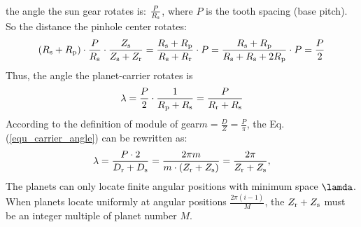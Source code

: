 \documentclass[a4paper,fleqn]{cas-sc}%
\begin{document}
the angle the sun gear rotates is: $\frac{P}{R_{\rm s}}$, where $P$ is the tooth spacing (base pitch). So the distance the pinhole center rotates:
\begin{equation}
    (R_{\rm s}+R_{\rm p}) \cdot \frac{P}{R_{\rm s}} \cdot \frac{Z_{\rm s}}{Z_{\rm s}+Z_{\rm r}}
    =\frac{R_{\rm s}+R_{\rm p}}{R_{\rm s}+R_{\rm r}} \cdot P
    =\frac{R_{\rm s}+R_{\rm p}}{R_{\rm s}+R_{\rm s}+2R_{\rm p}} \cdot P
    =\frac{P}{2}
\end{equation}
Thus, the angle the planet-carrier rotates is
\begin{equation}
    \lambda=\frac{P}{2} \cdot \frac{1}{R_{\rm p}+R_{\rm s}}
    =\frac{P}{R_{\rm r}+R_{\rm s}}
    \label{equ_carrier_angle}
\end{equation}
According to the definition of module of gear$m=\frac{D}{Z}=\frac{P}{\pi}$, the Eq. (\ref{equ_carrier_angle}) can be rewritten as:
\begin{equation}
    \lambda=\frac{P \cdot 2}{D_{\rm r}+D_{\rm s}}
    =\frac{2 \pi m}{m \cdot ({Z_{\rm r}}+Z_{\rm s})}
    =\frac{2 \pi}{Z_{\rm r}+Z_{\rm s}},
\end{equation}
The planets can only locate finite angular positions with minimum space $\lamda$. When planets locate uniformly at angular positions $\frac{2\pi(i-1)}{M}$, the $Z_{\rm r}+Z_{\rm s}$ must be an integer multiple of planet number $M$.


\end{document}
